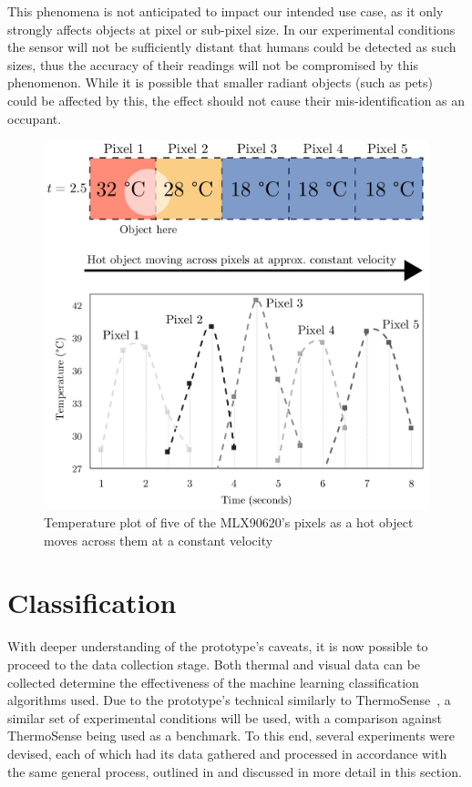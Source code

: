 \documentclass[../thesis/thesis.tex]{subfiles}
\begin{document}
This phenomena is not anticipated to impact our intended use case, as it only strongly affects objects at pixel or sub-pixel size. In our experimental conditions the sensor will not be sufficiently distant that humans could be detected as such sizes, thus the accuracy of their readings will not be compromised by this phenomenon. While it is possible that smaller radiant objects (such as pets) could be affected by this, the effect should not cause their mis-identification as an occupant.

\begin{figure}
\centering
\includegraphics[width=\textwidth]{../diagrams/03_hot_water_top_row_modified2.pdf}
\caption{Temperature plot of five of the MLX90620's pixels as a hot object moves across them at a constant velocity}
\label{fig:hotmotion}
\end{figure}

\clearpage{}

\section{Classification}
With deeper understanding of the prototype's caveats, it is now possible to proceed to the data collection stage. Both thermal and visual data can be collected determine the effectiveness of the machine learning classification algorithms used. Due to the prototype's technical similarly to ThermoSense~\cite{beltran2013thermosense}, a similar set of experimental conditions will be used, with a comparison against ThermoSense being used as a benchmark. To this end, several experiments were devised, each of which had its data gathered and processed in accordance with the same general process, outlined in  and discussed in more detail in this section.
\end{document}
